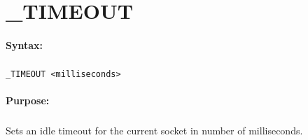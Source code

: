 
\newpage
\section{\_TIMEOUT}
\label{cmd:_TIMEOUT}

\paragraph{Syntax:}
\subparagraph{}
\texttt{\_TIMEOUT <milliseconds>}

\paragraph{Purpose:}
\subparagraph{}
Sets an idle timeout for the current socket in 
number of milliseconds.